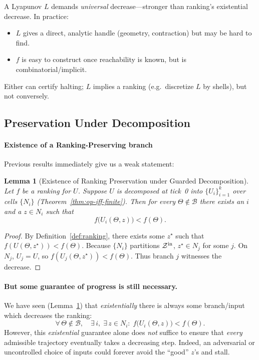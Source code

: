 \documentclass[12pt]{article}
\theoremstyle{definition}
\theoremstyle{plain}
\newtheorem{lemma}{Lemma}[section]
\begin{document}
\noindent A Lyapunov $L$ demands \emph{universal} decrease—stronger than ranking’s existential decrease.  In practice:
\begin{itemize}
  \item $L$ gives a direct, analytic handle (geometry, contraction) but may be hard to find.
  \item $f$ is easy to construct once reachability is known, but is combinatorial/implicit.
\end{itemize}
Either can certify halting; $L$ implies a ranking (e.g.\ discretize $L$ by shells), but not conversely.

\subsection{Preservation Under Decomposition}
\label{subsec:ranking-preserve}
\paragraph{Existence of a Ranking-Preserving branch}
Previous results immediately give us a weak statement:
\begin{lemma}[Existence of Ranking Preservation under Guarded Decomposition]
\label{lem:ranking-preserve}
Let $f$ be a ranking for $U$.  Suppose $U$ is decomposed at tick 0 into $\{U_i\}_{i=1}^k$ over cells $\{N_i\}$ (Theorem~\ref{thm:op-iff-finite}).  Then for every $\Theta\notin\mathcal B$ there exists an $i$ and a $z\in N_i$ such that
\[
  f\bigl(U_i(\Theta,z)\bigr) < f(\Theta).
\]
\end{lemma}

\begin{proof}
By Definition~\ref{def:ranking}, there exists some $z^\star$ such that $f(U(\Theta,z^\star))<f(\Theta)$.  Because $\{N_i\}$ partitions $\mathcal Z^{\rm in}$, $z^\star\in N_j$ for some $j$.  On $N_j$, $U_j=U$, so $f(U_j(\Theta,z^\star))<f(\Theta)$.  Thus branch $j$ witnesses the decrease.
\end{proof}

\paragraph{But some guarantee of progress is still necessary.}
We have seen (Lemma~\ref{lem:ranking-preserve}) that \emph{existentially} there is always some branch/input which decreases the ranking:
\[
  \forall\,\Theta\notin\mathcal B,\quad
  \exists\,i,\; \exists\,z\in N_i:\;
    f\bigl(U_i(\Theta,z)\bigr)<f(\Theta).
\]
However, this \emph{existential} guarantee alone does \emph{not} suffice to ensure that \emph{every} admissible trajectory eventually takes a decreasing step.  Indeed, an adversarial or uncontrolled choice of inputs could forever avoid the “good” $z$’s and stall.
\end{document}
